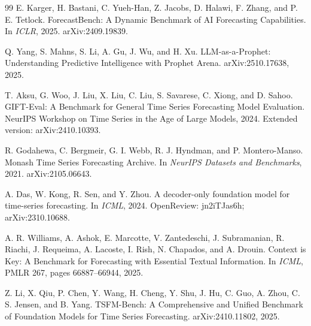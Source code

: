 \documentclass{article}
\begin{document}
\begingroup
\small
\setlength{\emergencystretch}{2em}
\begin{thebibliography}{99}
E. Karger, H. Bastani, C. Yueh-Han, Z. Jacobs, D. Halawi, F. Zhang, and P. E. Tetlock.
\newblock ForecastBench: A Dynamic Benchmark of AI Forecasting Capabilities.
\newblock In \emph{ICLR}, 2025. arXiv:2409.19839.

Q. Yang, S. Mahns, S. Li, A. Gu, J. Wu, and H. Xu.
\newblock LLM-as-a-Prophet: Understanding Predictive Intelligence with Prophet Arena.
\newblock arXiv:2510.17638, 2025.

T. Aksu, G. Woo, J. Liu, X. Liu, C. Liu, S. Savarese, C. Xiong, and D. Sahoo.
\newblock GIFT-Eval: A Benchmark for General Time Series Forecasting Model Evaluation.
\newblock NeurIPS Workshop on Time Series in the Age of Large Models, 2024. Extended version: arXiv:2410.10393.

R. Godahewa, C. Bergmeir, G. I. Webb, R. J. Hyndman, and P. Montero-Manso.
\newblock Monash Time Series Forecasting Archive.
\newblock In \emph{NeurIPS Datasets and Benchmarks}, 2021. arXiv:2105.06643.

A. Das, W. Kong, R. Sen, and Y. Zhou.
\newblock A decoder-only foundation model for time-series forecasting.
\newblock In \emph{ICML}, 2024. OpenReview: jn2iTJas6h; arXiv:2310.10688.

A. R. Williams, A. Ashok, E. Marcotte, V. Zantedeschi, J. Subramanian, R. Riachi, J. Requeima, A. Lacoste, I. Rish, N. Chapados, and A. Drouin.
\newblock Context is Key: A Benchmark for Forecasting with Essential Textual Information.
\newblock In \emph{ICML}, PMLR 267, pages 66887--66944, 2025.

Z. Li, X. Qiu, P. Chen, Y. Wang, H. Cheng, Y. Shu, J. Hu, C. Guo, A. Zhou, C. S. Jensen, and B. Yang.
\newblock TSFM-Bench: A Comprehensive and Unified Benchmark of Foundation Models for Time Series Forecasting.
\newblock arXiv:2410.11802, 2025.


\end{thebibliography}
\end{document}
